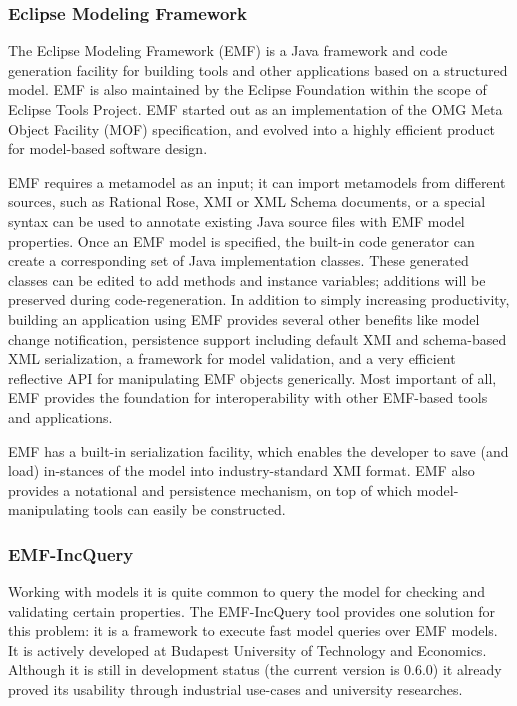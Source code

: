 \subsubsection{Eclipse Modeling Framework}
The Eclipse Modeling Framework (EMF) \cite{EMF} is a Java framework and code
generation facility for building tools and other applications based on a
structured model. EMF is also maintained by the Eclipse Foundation within the
scope of Eclipse Tools Project. EMF started out as an implementation of the OMG
Meta Object Facility (MOF) specification, and evolved into a highly efficient
product for model-based software design.

EMF requires a metamodel as an input; it can import metamodels from different
sources, such as Rational Rose, XMI or XML Schema documents, or a special syntax
can be used to annotate existing Java source files with EMF model properties.
Once an EMF model is specified, the built-in code generator can create a
corresponding set of Java implementation classes.
These generated classes can be edited to add methods and instance variables;
additions will be preserved during code-regeneration. In addition to simply
increasing productivity, building an application using EMF provides several
other benefits like model change notification, persistence support including
default XMI and schema-based XML serialization, a framework for model
validation, and a very efficient reflective API for manipulating EMF objects
generically. Most important of all, EMF provides the foundation for
interoperability with other EMF-based tools and applications.

EMF has a built-in serialization facility, which enables the developer to save
(and load) in-stances of the model into industry-standard XMI format. EMF also
provides a notational and persistence mechanism, on top of which
model-manipulating tools can easily be constructed.


\subsubsection{EMF-IncQuery} 
Working with models it is quite common to query the model for checking and
validating certain properties. The EMF-IncQuery \cite{EMFIncQuery} tool provides
one solution for this problem: it is a framework to execute fast model queries
over EMF models. It is actively developed at Budapest University of Technology
and Economics. Although it is still in development status (the current
version is 0.6.0) it already proved its usability through industrial use-cases
and university researches.

